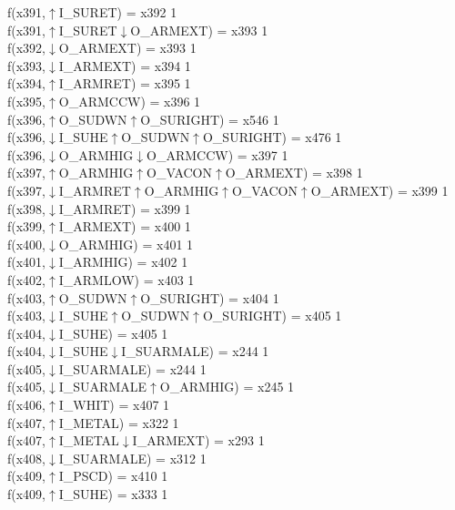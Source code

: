 f(x391,$\uparrow$I\_SURET) = x392 {1} \\
f(x391,$\uparrow$I\_SURET$\downarrow$O\_ARMEXT) = x393 {1} \\
f(x392,$\downarrow$O\_ARMEXT) = x393 {1} \\
f(x393,$\downarrow$I\_ARMEXT) = x394 {1} \\
f(x394,$\uparrow$I\_ARMRET) = x395 {1} \\
f(x395,$\uparrow$O\_ARMCCW) = x396 {1} \\
f(x396,$\uparrow$O\_SUDWN$\uparrow$O\_SURIGHT) = x546 {1} \\
f(x396,$\downarrow$I\_SUHE$\uparrow$O\_SUDWN$\uparrow$O\_SURIGHT) = x476 {1} \\
f(x396,$\downarrow$O\_ARMHIG$\downarrow$O\_ARMCCW) = x397 {1} \\
f(x397,$\uparrow$O\_ARMHIG$\uparrow$O\_VACON$\uparrow$O\_ARMEXT) = x398 {1} \\
f(x397,$\downarrow$I\_ARMRET$\uparrow$O\_ARMHIG$\uparrow$O\_VACON$\uparrow$O\_ARMEXT) = x399 {1} \\
f(x398,$\downarrow$I\_ARMRET) = x399 {1} \\
f(x399,$\uparrow$I\_ARMEXT) = x400 {1} \\
f(x400,$\downarrow$O\_ARMHIG) = x401 {1} \\
f(x401,$\downarrow$I\_ARMHIG) = x402 {1} \\
f(x402,$\uparrow$I\_ARMLOW) = x403 {1} \\
f(x403,$\uparrow$O\_SUDWN$\uparrow$O\_SURIGHT) = x404 {1} \\
f(x403,$\downarrow$I\_SUHE$\uparrow$O\_SUDWN$\uparrow$O\_SURIGHT) = x405 {1} \\
f(x404,$\downarrow$I\_SUHE) = x405 {1} \\
f(x404,$\downarrow$I\_SUHE$\downarrow$I\_SUARMALE) = x244 {1} \\
f(x405,$\downarrow$I\_SUARMALE) = x244 {1} \\
f(x405,$\downarrow$I\_SUARMALE$\uparrow$O\_ARMHIG) = x245 {1} \\
f(x406,$\uparrow$I\_WHIT) = x407 {1} \\
f(x407,$\uparrow$I\_METAL) = x322 {1} \\
f(x407,$\uparrow$I\_METAL$\downarrow$I\_ARMEXT) = x293 {1} \\
f(x408,$\downarrow$I\_SUARMALE) = x312 {1} \\
f(x409,$\uparrow$I\_PSCD) = x410 {1} \\
f(x409,$\uparrow$I\_SUHE) = x333 {1} \\
